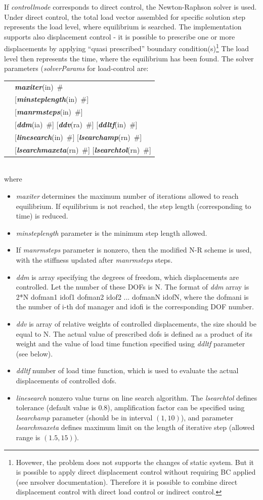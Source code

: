 \documentclass[a4paper]{article}
\makeatletter
\newcommand{\param}[1]{{\em #1}}
\newcommand{\keywordnotype}[1]{\mbox{{\it{\bf{#1}}}}}
\newcommand{\keyword}[2]{\mbox{{\keywordnotype{#1}\tiny (#2)}}}
\newcommand{\field}[2]{\mbox{\keyword{#1}{#2}~\#}}
\newcommand{\optField}[2]{\mbox{[\field{#1}{#2}]}}
\newenvironment{record}[1][]{\begin{tabular}{|ll}}{\end{tabular}\\}
\newcommand{\recentry}[2]{{#1}&{#2}\\}
\newcounter{rcc}
\newenvironment{record}[1][\textwidth]{\setcounter{rcc}{0}\begin{tabular*}{#1}{|ll@{\extracolsep{\fill}}r}}{\end{tabular*}\\}
\newcommand{\recentry}[2]{\ifthenelse{\value{rcc}>0}{&$\backslash$ \\}{\setcounter{rcc}{1}}{#1}&{#2}}
\makeatother
\begin{document}
If \param{controllmode} corresponds to direct control, the
Newton-Raphson solver is used. Under direct control, the total load
vector assembled for specific solution step represents the load level,
where equilibrium is searched. The implementation supports also
displacement control -  it is possible to prescribe one or more
displacements by applying ``quasi prescribed'' boundary
condition(s)\footnote{Hovewer, the problem does not supports the
changes of static system. But it is possible to apply direct
displacement control without requiring BC applied (see nrsolver
documentation). Therefore it is possible to combine
direct displacement control with direct load control or indirect
control.} 
The load level then represents the
time, where the equilibrium has been found. The solver parameters (\param{solverParams} for
load-control are:\\
\begin{record}
\recentry{\hspace{10mm}}{\field{maxiter}{in}}
\recentry{}{\optField{minsteplength}{in}}
\recentry{}{\optField{manrmsteps}{in}}
\recentry{}{\optField{ddm}{ia} \optField{ddv}{ra} \optField{ddltf}{in}}
\recentry{}{\optField{linesearch}{in} \optField{lsearchamp}{rn}}
\recentry{}{\optField{lsearchmaxeta}{rn} \optField{lsearchtol}{rn}}
\end{record}
where 
\begin{itemize}
\item \param{maxiter} determines the maximum
number of iterations allowed to reach equilibrium. If equilibrium is
not reached, the step length (corresponding to time) is reduced.
\item \param{minsteplength} parameter is the minimum step length
allowed. 
\item If \param{manrmsteps} parameter is nonzero, then the modified
N-R scheme is used, with the stiffness updated after
\param{manrmsteps} steps.
\item \param{ddm} is array specifying the degrees of freedom, 
which displacements are controlled. 
Let the number of these DOFs is N.
The format of \param{ddm} array is 2*N dofman1 idof1
dofman2 idof2 ... dofmanN idofN, where the dofmani is the number of i-th dof manager  and idofi is the
corresponding DOF number. 
\item \param{ddv} is array of relative weights of controlled
displacements, the size should be equal to N. The actual value of 
prescribed dofs is defined as a product of its weight and the value of
load time function specified using \param{ddltf} parameter (see
below).
\item \param{ddltf} number of load time function, which is used to
evaluate the actual displacements of controlled dofs.
\item \param {linesearch} nonzero value turns on line search
  algorithm. The \param{lsearchtol} defines tolerance (default value
  is 0.8), amplification
  factor can be specified using \param{lsearchamp} parameter (should
  be in interval $(1,10)$), and parameter \param{lsearchmaxeta}
  defines maximum limit on the length of iterative step (allowed range
  is $(1.5,15)$).
\end{itemize}
\end{document}

